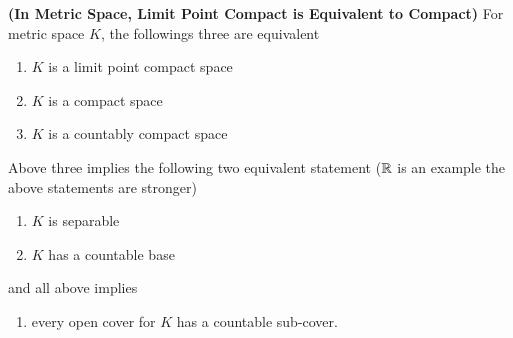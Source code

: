 \documentclass{report}
\begin{document}
\begin{theorem}
\label{2.7.5}
\textbf{(In Metric Space, Limit Point Compact is Equivalent to Compact)} For metric space $K$, the followings three are equivalent
\begin{enumerate}[label=(\alph*)]
  \item $K$ is a limit point compact space
  \item $K$ is a compact space
  \item $K$ is a countably compact space
\end{enumerate}
Above three implies the following two equivalent statement ($\mathbb{R}$ is an example the above statements are stronger)
\begin{enumerate}[label=(\arabic*)]
  \item $K$ is separable
  \item $K$ has a countable base
\end{enumerate}
and all above implies
\begin{enumerate}[label=(\roman*)]
  \item every open cover for $K$ has a countable sub-cover.
\end{enumerate}
\end{theorem}
\end{document}

